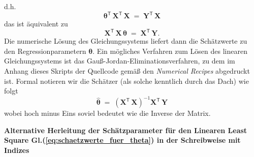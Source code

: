 d.h.
\begin{equation}
\boldsymbol{\theta}^\mathsf{T} \, \mathbf{X}^\mathsf{T}  \, \mathbf{X} \; = \;
\mathbf{Y}^\mathsf{T} \, \mathbf{X}
\end{equation}
das ist äquivalent zu
\begin{equation}
\mathbf{X}^\mathsf{T} \, \mathbf{X} \, \boldsymbol{\theta} \; = \;
\mathbf{X}^\mathsf{T} \, \mathbf{Y} .
\end{equation}
Die numerische Lösung des Gleichungssystems liefert dann die Schätzwerte zu
den Regressionparametern $\boldsymbol{\theta}$. Ein mögliches Verfahren zum
Lösen des linearen Gleichungssystems ist das Gauß-Jordan-Eliminationsverfahren, zu
dem im Anhang dieses Skripts der Quellcode gemäß den \textsl{Numerical Recipes}
\cite{Fla02} abgedruckt ist.
Formal notieren wir 
die Schätzer (als solche kenntlich durch das Dach) wie folgt
\begin{equation}
\boldsymbol{\hat \theta} \; = \;
\left( \mathbf{X}^\mathsf{T}  \, \mathbf{X} \right)^{-1} \mathbf{X}^\mathsf{T} \, \mathbf{Y}
\label{eq:schaetzwerte_fuer_theta}
\end{equation}
wobei hoch minus Eins soviel bedeutet wie die Inverse der Matrix.

\textbf{Alternative Herleitung der Schätzparameter für den Linearen Least Square Gl.(\ref{eq:schaetzwerte_fuer_theta}) in der Schreibweise mit Indizes}

